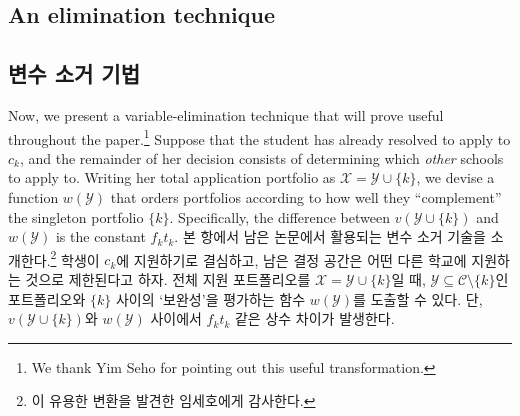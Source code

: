 \documentclass[11pt]{article} %
\theoremstyle{definition}
\theoremstyle{definition}
\begin{document}
\ifen \subsection{An elimination technique} \else \subsection{변수 소거 기법} \fi
\ifen
Now, we present a variable-elimination technique that will prove useful throughout the paper.\footnote{We thank Yim Seho for pointing out this useful transformation.} Suppose that the student has already resolved to apply to $c_k$, and the remainder of her decision consists of determining which \emph{other} schools to apply to. Writing her total application portfolio as $\mathcal{X} = \mathcal{Y} \cup \{k\}$, we devise a function $w(\mathcal{Y})$ that orders portfolios according to how well they ``complement'' the singleton portfolio $\{k\}$. Specifically, the difference between $v(\mathcal{Y} \cup\{k\})$ and $w(\mathcal{Y})$ is the constant $f_k t_k$.
\else
본 항에서 남은 논문에서 활용되는 변수 소거 기술을 소개한다.\footnote{이 유용한 변환을 발견한 임세호에게 감사한다.} 학생이 $c_k$에 지원하기로 결심하고, 남은 결정 공간은 어떤 다른 학교에 지원하는 것으로 제한된다고 하자. 전체 지원 포트폴리오를 $\mathcal{X} = \mathcal{Y} \cup \{k\}$일 때, $\mathcal{Y} \subseteq \mathcal{C} \setminus \{k\}$인 포트폴리오와 $\{k\}$ 사이의 \mbox{`보완성'을} 평가하는 함수 $w(\mathcal{Y})$를 도출할 수 있다. 단, $v(\mathcal{Y} \cup\{k\})$와 $w(\mathcal{Y})$ 사이에서 $f_k t_k$ 같은 상수 차이가 발생한다.
\fi 
\end{document}
